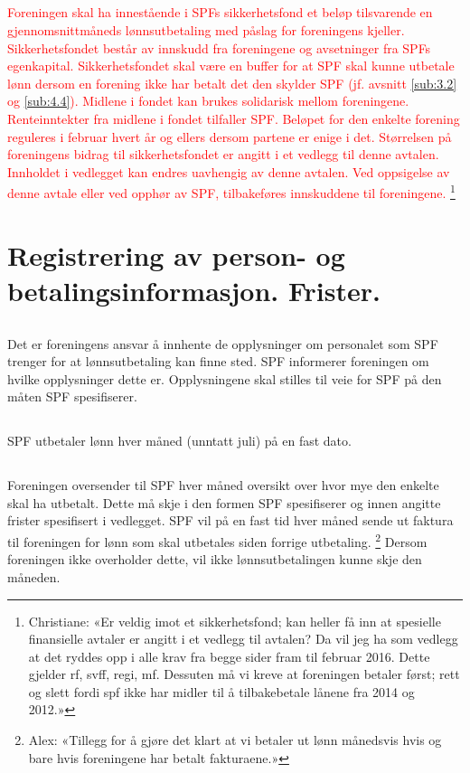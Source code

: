 \documentclass[12pt]{article}
\begin{document}
\subsection{}
\label{sub:3.3}
\textcolor{Red}{Foreningen skal ha innestående i SPFs 
sikkerhetsfond et beløp tilsvarende en 
gjennomsnittmåneds lønnsutbetaling med påslag for 
foreningens kjeller. Sikkerhetsfondet består av 
innskudd fra foreningene og avsetninger fra SPFs 
egenkapital. Sikkerhetsfondet skal være en buffer 
for at SPF skal kunne utbetale lønn dersom en 
forening ikke har betalt det den skylder SPF (jf. 
avsnitt \ref{sub:3.2} og \ref{sub:4.4}). Midlene i 
fondet kan brukes solidarisk mellom foreningene. 
Renteinntekter fra midlene i fondet tilfaller SPF. 
Beløpet for den enkelte forening reguleres i 
februar hvert år og ellers dersom partene er enige 
i det. Størrelsen på foreningens bidrag til 
sikkerhetsfondet er angitt i et vedlegg til denne 
avtalen. Innholdet i vedlegget kan endres 
uavhengig 
av denne avtalen. Ved oppsigelse av denne avtale 
eller ved opphør av SPF, tilbakeføres innskuddene 
til foreningene.}
\footnote{Christiane: «Er veldig imot et sikkerhetsfond; kan heller få inn at 
spesielle finansielle avtaler er angitt i et vedlegg til avtalen?
Da vil jeg ha som vedlegg at det ryddes opp i alle krav fra begge sider fram til februar 
2016. Dette gjelder rf, svff, regi, mf. Dessuten må vi kreve at foreningen betaler først; 
rett og slett fordi spf ikke har midler til å tilbakebetale lånene fra 2014 og 2012.»}
\section{Registrering av person- og betalingsinformasjon. Frister.}
\label{sec:4}
\subsection{}
\label{sub:4.1}
Det er foreningens ansvar å innhente de opplysninger om personalet som SPF trenger for at lønnsutbetaling kan finne sted. SPF informerer foreningen om hvilke opplysninger dette er.
Opplysningene skal stilles til veie for SPF på den måten SPF spesifiserer.
\subsection{}
\label{sub:4.2}
SPF utbetaler lønn hver måned (unntatt juli) på en fast dato.
\subsection{}
\label{sub:4.3}
Foreningen oversender til SPF hver måned oversikt over hvor mye den enkelte skal ha 
utbetalt.
Dette må skje i den formen SPF spesifiserer
og innen angitte frister \textcolor{Cerulean}{spesifisert i vedlegget.
SPF vil på en fast tid hver måned sende ut faktura
til foreningen for lønn som skal utbetales siden forrige utbetaling.}
\footnote{Alex: «Tillegg for å gjøre det klart at vi betaler ut
lønn månedsvis hvis og bare hvis foreningene har betalt fakturaene.»}
Dersom foreningen ikke overholder dette,
vil ikke lønnsutbetalingen kunne skje
den måneden.
\end{document}

